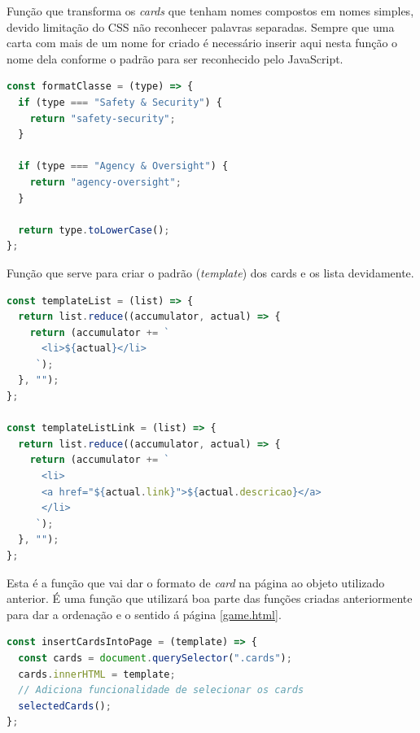 Função que transforma os \textit{cards} que tenham nomes compostos em nomes simples, devido limitação do \acrshort{CSS} não reconhecer palavras separadas. Sempre que uma carta com mais de um nome for criado é necessário inserir aqui nesta função o nome dela conforme o padrão para ser reconhecido pelo JavaScript.
\begin{lstlisting}[language=JavaScript, caption=Função que formata a classes de CSS]
const formatClasse = (type) => {
  if (type === "Safety & Security") {
    return "safety-security";
  }

  if (type === "Agency & Oversight") {
    return "agency-oversight";
  }

  return type.toLowerCase();
};
\end{lstlisting}

Função que serve para criar o padrão (\textit{template}) dos cards e os lista devidamente.
\begin{lstlisting}[language=JavaScript, caption=Template de List do Card]
const templateList = (list) => {
  return list.reduce((accumulator, actual) => {
    return (accumulator += `
      <li>${actual}</li>
     `);
  }, "");
};

const templateListLink = (list) => {
  return list.reduce((accumulator, actual) => {
    return (accumulator += `
      <li>
      <a href="${actual.link}">${actual.descricao}</a>
      </li>
     `);
  }, "");
};
\end{lstlisting}

Esta é a função que vai dar o formato de \textit{card} na página ao objeto utilizado anterior. É uma função que utilizará boa parte das funções criadas anteriormente para dar a ordenação e o sentido á página \ref{game.html}.
\begin{lstlisting}[language=JavaScript, caption=Função que pega template criado e adiciona no DOM]
const insertCardsIntoPage = (template) => {
  const cards = document.querySelector(".cards");
  cards.innerHTML = template;
  // Adiciona funcionalidade de selecionar os cards
  selectedCards();
};
\end{lstlisting}

